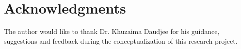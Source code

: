 \documentclass{sig-alternate}
\begin{document}
\section{Acknowledgments}
The author would like to thank Dr. Khuzaima Daudjee for his guidance, suggestions and feedback during the conceptualization of this research project.\\




\end{document}

